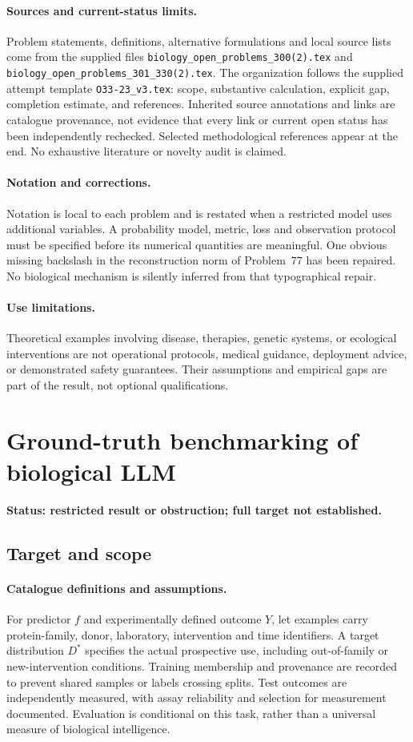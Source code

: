 \documentclass[11pt]{article}
\begin{document}
\paragraph{Sources and current-status limits.}
Problem statements, definitions, alternative formulations and local source lists
come from the supplied files
\texttt{biology\_open\_problems\_300(2).tex} and
\texttt{biology\_open\_problems\_301\_330(2).tex}.
The organization follows the supplied attempt template
\texttt{O33-23\_v3.tex}: scope, substantive calculation, explicit gap,
completion estimate, and references. Inherited source annotations and links are
catalogue provenance, not evidence that every link or current open status has
been independently rechecked. Selected methodological references appear at the
end. No exhaustive literature or novelty audit is claimed.

\paragraph{Notation and corrections.}
Notation is local to each problem and is restated when a restricted model uses
additional variables. A probability model, metric, loss and observation protocol
must be specified before its numerical quantities are meaningful. One obvious
missing backslash in the reconstruction norm of Problem~77 has been repaired.
No biological mechanism is silently inferred from that typographical repair.

\paragraph{Use limitations.}
Theoretical examples involving disease, therapies, genetic systems, or ecological
interventions are not operational protocols, medical guidance, deployment advice,
or demonstrated safety guarantees. Their assumptions and empirical gaps are part
of the result, not optional qualifications.


\section*{Ground-truth benchmarking of biological LLM}
\label{prob:080}
\noindent\textbf{Status: restricted result or obstruction; full target not established.}
\subsection{Target and scope}
\paragraph{Catalogue definitions and assumptions.}
For predictor $f$ and experimentally defined outcome $Y$, let examples carry protein-family, donor, laboratory, intervention and time identifiers. A target distribution $D^*$ specifies the actual prospective use, including out-of-family or new-intervention conditions. Training membership and provenance are recorded to prevent shared samples or labels crossing splits. Test outcomes are independently measured, with assay reliability and selection for measurement documented. Evaluation is conditional on this task, rather than a universal measure of biological intelligence.
\end{document}
